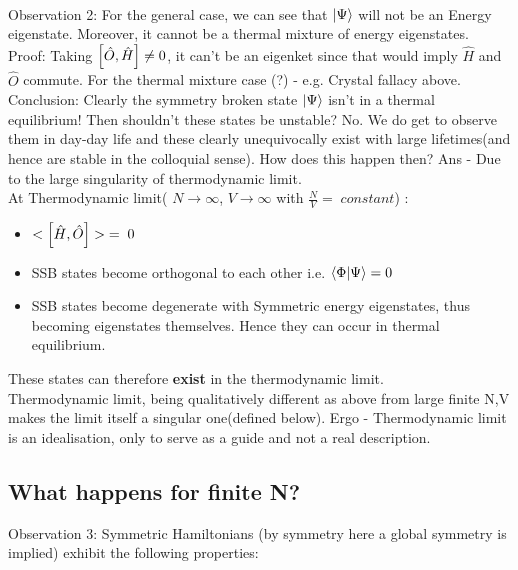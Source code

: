 \documentclass[12pt]{article}
\begin{document}
\\
Observation 2: For the general case, we can see that $\ket{\Psi}$ will not be an Energy eigenstate. Moreover, it cannot be a thermal mixture of energy eigenstates.\\
Proof: Taking $\comm{\hat{O}}{\hat{H}}\neq 0$, it can't be an eigenket since that would imply $\hat{H}$ and $\hat{O}$ commute.
For the thermal mixture case (?) - e.g. Crystal fallacy above.\\
\newline
Conclusion: Clearly the symmetry broken state $\ket{\Psi}$ isn't in a thermal equilibrium! Then shouldn't these states be unstable? 
No. We do get to observe them in day-day life and these clearly unequivocally exist with large lifetimes(and hence are stable in the colloquial sense).
How does this happen then? Ans - Due to the large singularity of thermodynamic limit. \\
At Thermodynamic limit( $N\rightarrow \infty$, $V\rightarrow \infty$ with $\displaystyle{\frac{N}{V}=\; constant}$) :
\begin{itemize}
    \item  $<\comm{\hat{H}}{\hat{O}}>\;=\;0$
    \item SSB states become orthogonal to each other i.e. $\braket{\Phi}{\Psi}=0$
    \item SSB states become degenerate with Symmetric energy eigenstates, thus becoming eigenstates themselves. Hence they can occur in thermal equilibrium.
\end{itemize}
These states can therefore \textbf{exist} in the thermodynamic limit.\\
Thermodynamic limit, being qualitatively different as above from large finite N,V makes the limit itself a singular one(defined below). Ergo - Thermodynamic limit is an idealisation, only to serve as a guide and not a real description.
\subsection{What happens for finite N?}
Observation 3: Symmetric Hamiltonians (by symmetry here a global symmetry is implied) exhibit the following properties:
\end{document}
